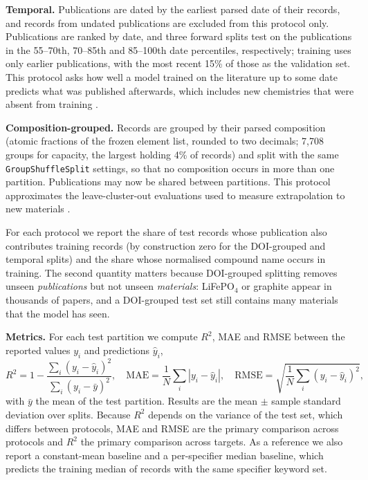\documentclass[journal=jcisd8,manuscript=article,layout=traditional]{achemso}
\begin{document}
\textbf{Temporal.} Publications are dated by the earliest parsed date of their records, and records from undated publications are excluded from this protocol only. Publications are ranked by date, and three forward splits test on the publications in the 55--70th, 70--85th and 85--100th date percentiles, respectively; training uses only earlier publications, with the most recent 15\% of those as the validation set. This protocol asks how well a model trained on the literature up to some date predicts what was published afterwards, which includes new chemistries that were absent from training \cite{sheridan2013timesplit}.

\textbf{Composition-grouped.} Records are grouped by their parsed composition (atomic fractions of the frozen element list, rounded to two decimals; 7,708 groups for capacity, the largest holding 4\% of records) and split with the same \texttt{GroupShuffleSplit} settings, so that no composition occurs in more than one partition. Publications may now be shared between partitions. This protocol approximates the leave-cluster-out evaluations used to measure extrapolation to new materials \cite{meredig2018cluster,witman2025matfold}.

For each protocol we report the share of test records whose publication also contributes training records (by construction zero for the DOI-grouped and temporal splits) and the share whose normalised compound name occurs in training. The second quantity matters because DOI-grouped splitting removes unseen \emph{publications} but not unseen \emph{materials}: LiFePO$_4$ or graphite appear in thousands of papers, and a DOI-grouped test set still contains many materials that the model has seen.



\textbf{Metrics.} For each test partition we compute $R^2$, MAE and RMSE between the reported values $y_i$ and predictions $\hat y_i$,
\begin{equation}
    R^2 = 1-\frac{\sum_{i}(y_i-\hat{y}_i)^2}{\sum_{i}(y_i-\bar{y})^2},\quad
    \mathrm{MAE} = \frac{1}{N}\sum_{i}|y_i-\hat{y}_i|,\quad
    \mathrm{RMSE} = \sqrt{\frac{1}{N}\sum_{i}(y_i-\hat{y}_i)^2},
\end{equation}
with $\bar y$ the mean of the test partition. Results are the mean $\pm$ sample standard deviation over splits. Because $R^2$ depends on the variance of the test set, which differs between protocols, MAE and RMSE are the primary comparison across protocols and $R^2$ the primary comparison across targets. As a reference we also report a constant-mean baseline and a per-specifier median baseline, which predicts the training median of records with the same specifier keyword set.
\end{document}
